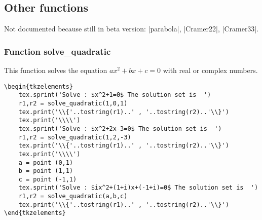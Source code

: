 \subsection{Other functions} %
\label{sub:other_functions}

Not documented because still in beta version: |parabola|, |Cramer22|, |Cramer33|.


\subsubsection{Function solve\_quadratic} %
\label{ssub:function_solve__quadratic}

This function solves the equation $ax^2+bx+c= 0$ with real or complex numbers.

\begin{minipage}{.6\textwidth}
\begin{Verbatim}
\begin{tkzelements}
    tex.sprint('Solve : $x^2+1=0$ The solution set is  ')
    r1,r2 = solve_quadratic(1,0,1)
    tex.print('\\{'..tostring(r1)..' , '..tostring(r2)..'\\}')
    tex.print('\\\\')
    tex.sprint('Solve : $x^2+2x-3=0$ The solution set is  ')
    r1,r2 = solve_quadratic(1,2,-3)
    tex.print('\\{'..tostring(r1)..' , '..tostring(r2)..'\\}')
    tex.print('\\\\')
    a = point (0,1)
    b = point (1,1)
    c = point (-1,1)
    tex.sprint('Solve : $ix^2+(1+i)x+(-1+i)=0$ The solution set is  ')
    r1,r2 = solve_quadratic(a,b,c)
    tex.print('\\{'..tostring(r1)..' , '..tostring(r2)..'\\}')
\end{tkzelements}
\end{Verbatim}
\end{minipage}

